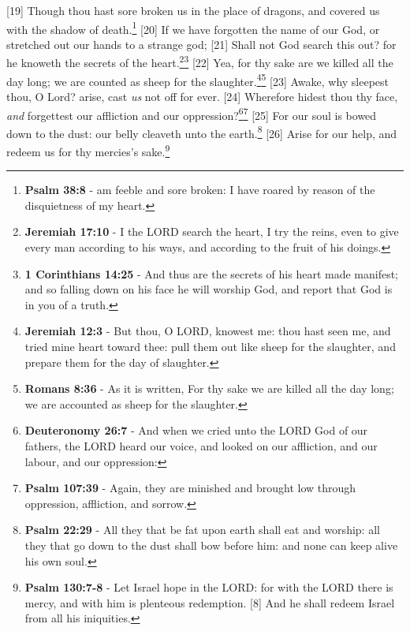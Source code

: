 [19] \textcolor[cmyk]{0.99998,1,0,0}{Though thou hast sore broken us in the place of dragons, and covered us with the shadow of death.}\footnote{\textbf{Psalm 38:8} -  am feeble and sore broken: I have roared by reason of the disquietness of my heart.}
[20] \textcolor[cmyk]{0.99998,1,0,0}{If we have forgotten the name of our God, or stretched out our hands to a strange god;}
[21] \textcolor[cmyk]{0.99998,1,0,0}{Shall not God search this out? for he knoweth the secrets of the heart.}\footnote{\textbf{Jeremiah 17:10} -  I the LORD search the heart, I try the reins, even to give every man according to his ways, and according to the fruit of his doings.}\footnote{\textbf{1 Corinthians 14:25} - And thus are the secrets of his heart made manifest; and so falling down on his face he will worship God, and report that God is in you of a truth.}
[22] \textcolor[cmyk]{0.99998,1,0,0}{Yea, for thy sake are we killed all the day long; we are counted as sheep for the slaughter.}\footnote{\textbf{Jeremiah 12:3} - But thou, O LORD, knowest me: thou hast seen me, and tried mine heart toward thee: pull them out like sheep for the slaughter, and prepare them for the day of slaughter.}\footnote{\textbf{Romans 8:36} - As it is written, For thy sake we are killed all the day long; we are accounted as sheep for the slaughter.}
[23] \textcolor[cmyk]{0.99998,1,0,0}{Awake, why sleepest thou, O Lord? arise, cast \emph{us} not off for ever.}
[24] \textcolor[cmyk]{0.99998,1,0,0}{Wherefore hidest thou thy face, \emph{and} forgettest our affliction and our oppression?}\footnote{\textbf{Deuteronomy 26:7} - And when we cried unto the LORD God of our fathers, the LORD heard our voice, and looked on our affliction, and our labour, and our oppression:}\footnote{\textbf{Psalm 107:39} - Again, they are minished and brought low through oppression, affliction, and sorrow.}
[25] \textcolor[cmyk]{0.99998,1,0,0}{For our soul is bowed down to the dust: our belly cleaveth unto the earth.}\footnote{\textbf{Psalm 22:29} - All they that be fat upon earth shall eat and worship: all they that go down to the dust shall bow before him: and none can keep alive his own soul.}
[26] \textcolor[cmyk]{0.99998,1,0,0}{Arise for our help, and redeem us for thy mercies's sake.}\footnote{\textbf{Psalm 130:7-8} - Let Israel hope in the LORD: for with the LORD there is mercy, and with him is plenteous redemption. [8] And he shall redeem Israel from all his iniquities.}



